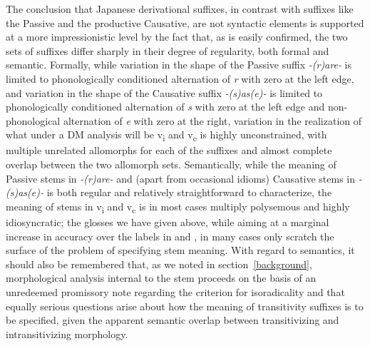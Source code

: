 \documentclass[output=paper,
modfonts
]{LSP/langsci}
\begin{document}
The conclusion that Japanese derivational suffixes, in contrast with
suffixes like the Passive and the productive Causative, are not
syntactic elements is supported at a more impressionistic level by the
fact that, as is easily confirmed, the two sets of suffixes differ
sharply in their degree of regularity, both formal and semantic.
Formally, while variation in the shape of the Passive suffix
\textit{-(r)are-} is limited to phonologically conditioned alternation of
\textit{r} with zero at the left edge, and variation in the shape of the
Causative suffix \textit{-(s)as(e)-} is limited to phonologically
conditioned alternation of \textit{s} with zero at the left edge and
non-phonological alternation of \textit{e} with zero at the right,
variation in the realization of what under a DM analysis will be
v\textsubscript{i} and v\textsubscript{c} is highly unconstrained, with
multiple unrelated allomorphs for each of the suffixes and almost
complete overlap between the two allomorph sets. Semantically, while the
meaning of Passive stems in \textit{-(r)are-} and (apart from occasional
idioms) Causative stems in \textit{-(s)as(e)-} is both regular and
relatively straightforward to characterize, the meaning of stems in
v\textsubscript{i} and v\textsubscript{c} is in most cases multiply
polysemous and highly idiosyncratic; the glosses we have given above,
while aiming at a marginal increase in accuracy over the labels in
\citet{jacobsen1992a} and \citet{volpe2005a}, in many cases only scratch the surface of
the problem of specifying stem meaning. With regard to semantics, it
should also be remembered that, as we noted in section~\ref{background}, morphological
analysis internal to the stem proceeds on the basis of an unredeemed
promissory note regarding the criterion for isoradicality and that
equally serious questions arise about how the meaning of transitivity
suffixes is to be specified, given the apparent semantic overlap between
transitivizing and intransitivizing morphology.
\end{document}
